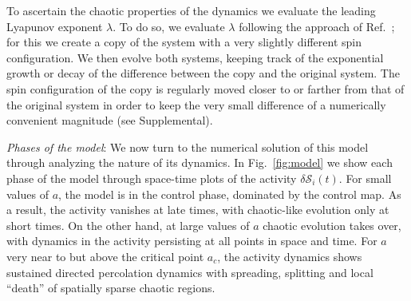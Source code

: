 \documentclass[twocolumn,amsmath,amssymb,floatfix,superscriptaddress,aps,prl]{revtex4-2}
\newcommand{\david}[1]{\textcolor{cyan}{#1}}
\begin{document}
To ascertain the chaotic properties of the dynamics we evaluate the leading Lyapunov exponent $\lambda$.
To do so, we evaluate $\lambda$ following the approach of Ref.~\cite{benettin1976kolmogorov}; for this we create a copy of the system  with a very slightly different spin configuration.  We then evolve both systems, keeping track of the exponential growth or decay of the difference between the copy and the original system.  The spin configuration of the copy is regularly moved closer to or farther from that of the original system in order to keep the very small difference of a numerically convenient magnitude 
(see Supplemental).  

{\it Phases of the model}:
%
We now turn to the numerical solution of this model through analyzing the nature of its dynamics. In Fig.~\ref{fig:model} we show each phase of the model through space-time plots of the activity $\delta \mathcal{S}_i(t)$. For small values of $a$, the model is in the control phase, dominated by the control map. As a result, the activity vanishes at late times, with chaotic-like evolution only at short times. On the other hand, at large values of $a$ chaotic evolution takes over, with dynamics in the activity persisting at all points in space and time. 
For $a$ very near to but above the critical point $a_c$, the activity dynamics shows sustained directed percolation dynamics with spreading, splitting %
and local ``death'' of spatially sparse chaotic regions.  %
\end{document}
